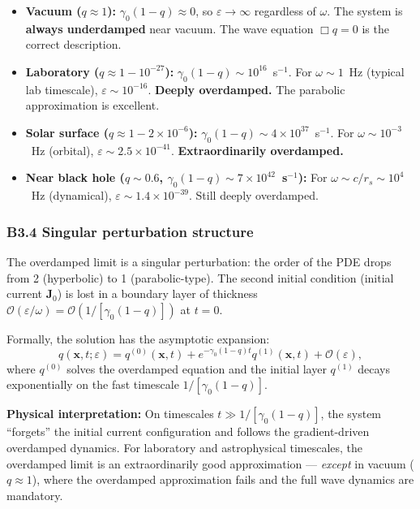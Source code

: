 \documentclass[reprint]{revtex4-2}
\begin{document}
\begin{itemize}
\item \textbf{Vacuum ($q\approx 1$):} $\gamma_0(1-q) \approx 0$, so $\varepsilon \to \infty$ regardless of $\omega$. The system is \textbf{always underdamped} near vacuum. The wave equation $\Box q = 0$ is the correct description.
\item \textbf{Laboratory ($q\approx 1-10^{-27}$):} $\gamma_0(1-q) \sim 10^{16}$~s$^{-1}$. For $\omega \sim 1$~Hz (typical lab timescale), $\varepsilon \sim 10^{-16}$. \textbf{Deeply overdamped.} The parabolic approximation is excellent.
\item \textbf{Solar surface ($q\approx 1-2\times 10^{-6}$):} $\gamma_0(1-q) \sim 4\times 10^{37}$~s$^{-1}$. For $\omega \sim 10^{-3}$~Hz (orbital), $\varepsilon \sim 2.5\times 10^{-41}$. \textbf{Extraordinarily overdamped.}
\item \textbf{Near black hole ($q\sim 0.6$, $\gamma_0(1-q)\sim 7\times 10^{42}$~s$^{-1}$):} For $\omega \sim c/r_s \sim 10^{4}$~Hz (dynamical), $\varepsilon \sim 1.4\times 10^{-39}$. Still deeply overdamped.
\end{itemize}

\subsubsection{B3.4 Singular perturbation structure}

The overdamped limit is a singular perturbation: the order of the PDE drops from 2 (hyperbolic) to 1 (parabolic-type). The second initial condition (initial current $\mathbf{J}_0$) is lost in a boundary layer of thickness $\mathcal{O}(\varepsilon/\omega) = \mathcal{O}(1/[\gamma_0(1-q)])$ at $t=0$.

Formally, the solution has the asymptotic expansion:
\begin{equation}
q(\mathbf{x},t;\varepsilon) = q^{(0)}(\mathbf{x},t) + e^{-\gamma_0(1-q)t}q^{(1)}(\mathbf{x},t) + \mathcal{O}(\varepsilon),
\end{equation}
where $q^{(0)}$ solves the overdamped equation and the initial layer $q^{(1)}$ decays exponentially on the fast timescale $1/[\gamma_0(1-q)]$.

\textbf{Physical interpretation:} On timescales $t \gg 1/[\gamma_0(1-q)]$, the system ``forgets'' the initial current configuration and follows the gradient-driven overdamped dynamics. For laboratory and astrophysical timescales, the overdamped limit is an extraordinarily good approximation --- \emph{except} in vacuum ($q\approx 1$), where the overdamped approximation fails and the full wave dynamics are mandatory.
\end{document}
